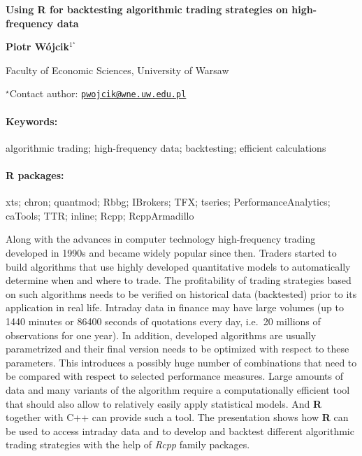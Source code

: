 \documentclass[11pt, a4paper]{article}
\renewcommand{\title}[1]{\begin{center}{\bf \LARGE #1}\end{center}}
\newcommand{\keywords}{\paragraph{Keywords:}}
\newcommand{\packages}{\paragraph{R packages:}}
\begin{document}
\pagestyle{empty}

\title{Using R for backtesting algorithmic trading strategies on high-frequency
data}

\begin{center}
  {\bf Piotr Wójcik$^{1^\star}$}
\end{center}

\vskip 0.3cm

\begin{affiliations}
\begin{enumerate}
\begin{minipage}{0.915\textwidth}
\centering
\item Faculty of Economic Sciences, University of Warsaw \\[-2pt]
\end{minipage}
\end{enumerate}
$^\star$Contact author: \href{mailto:pwojcik@wne.uw.edu.pl}{\nolinkurl{pwojcik@wne.uw.edu.pl}}\\
\end{affiliations}

\vskip 0.5cm

\begin{minipage}{0.915\textwidth}
\keywords algorithmic trading; high-frequency data; backtesting; efficient
calculations
\packages xts; chron; quantmod; Rbbg; IBrokers; TFX; tseries;
PerformanceAnalytics; caTools; TTR; inline; Rcpp; RcppArmadillo
\end{minipage}

\vskip 0.8cm

Along with the advances in computer technology high-frequency trading
developed in 1990s and became widely popular since then. Traders started
to build algorithms that use highly developed quantitative models to
automatically determine when and where to trade. The profitability of
trading strategies based on such algorithms needs to be verified on
historical data (backtested) prior to its application in real life.
Intraday data in finance may have large volumes (up to 1440 minutes or
86400 seconds of quotations every day, i.e.~20 millions of observations
for one year). In addition, developed algorithms are usually
parametrized and their final version needs to be optimized with respect
to these parameters. This introduces a possibly huge number of
combinations that need to be compared with respect to selected
performance measures. Large amounts of data and many variants of the
algorithm require a computationally efficient tool that should also
allow to relatively easily apply statistical models. And \textbf{R}
together with C++ can provide such a tool. The presentation shows how
\textbf{R} can be used to access intraday data and to develop and
backtest different algorithmic trading strategies with the help of
\emph{Rcpp} family packages.
\end{document}
